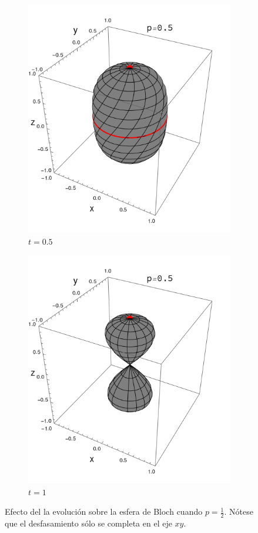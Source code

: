 \begin{figure}[ht!]
\begin{subfigure}{0.32\textwidth}
      \includegraphics[width=0.9\linewidth]{chapter3/figures_special/sphere_Ising_t=0.5_z=0.9_p=0.5.png}
      \caption{$t=0.5$}
    \end{subfigure}
    \begin{subfigure}{0.32\textwidth}
      \centering
      \includegraphics[width=0.9\linewidth]{chapter3/figures_special/sphere_Ising_t=1._z=0.9_p=0.5.png}
      \caption{$t=1$}
    \end{subfigure}
    \caption{Efecto del la evolución sobre la esfera de Bloch cuando $p=\frac{1}{2}$. Nótese que el desfasamiento sólo se completa en el eje $xy$.}
    \label{fig:Ising_p0.5_Sequence}
    \end{figure}

